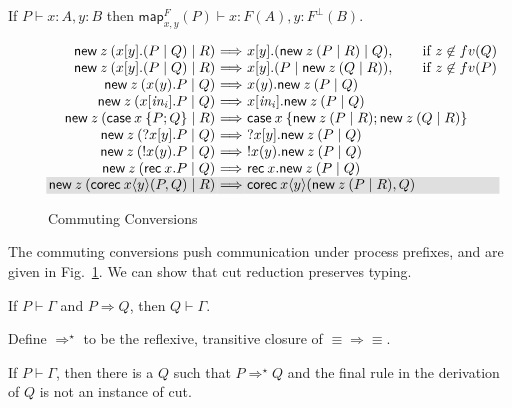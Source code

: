 \documentclass[orivec,envcountsame]{llncs}
\makeatletter
\newcommand{\cpdual}[1]{#1^\perp}
\newcommand{\cptyp}[2]{#1 \vdash #2}
\newcommand{\mapname}{\mathsf{map}}
\newcommand{\map}[3]{\mapname^{#1}_{#2}(#3)}
\newcommand{\mkwd}[1]{\mathsf{#1}}
\newcommand{\cut}[4]{\mkwd{new}\:#1 \: (#3 \mid #4)}
\newcommand{\replicate}[2]{{!#1(#2)}}
\newcommand{\derelict}[2]{{?#1[#2]}}
\newcommand{\rec}[1]{\mkwd{rec}\:#1}
\newcommand{\corec}[4]{\mkwd{corec}\:{#1} \langle #2 \rangle (#3,#4)}
\newcommand{\clabel}[1]{\mathit{#1}}
\renewcommand{\case}[2]{\mkwd{case}\:#1\:\{#2\}}
\newcommand{\sel}[2]{#1[\clabel{#2}]}
\newcommand{\ba}{\begin{array}}
\newcommand{\ea}{\end{array}}
\newenvironment{equations}{\[\ba{@{}r@{~}c@{~}l@{}}}{\ea\]}
\newcommand\shaderow{\noalign{\vskip-0.4pt}\rowcolor{shade}[0.6mm]}
\makeatother
\begin{document}
\begin{lemma}
  If $\cptyp{P}{x:A,y:B}$ then \(\cptyp{\map{F}{x,y}{P}}{x:F(A),y:\cpdual{F}(B)}.\)
\end{lemma}

\begin{figure}[float]
\small
\begin{equations}
  \cut{z}{A}{x[y].(P \mid Q)}{R} &\Longrightarrow& x[y].(\cut{z}{A}{P}{R} \mid Q), \qquad \text{if $z \not\in fv(Q)$} \\
  \cut{z}{A}{x[y].(P \mid Q)}{R} &\Longrightarrow& x[y].(P \mid \cut{z}{A}{Q}{R}), \qquad \text{if $z \not\in fv(P)$} \\
  \cut{z}{A}{x(y).P}{Q} &\Longrightarrow& x(y).\cut{z}{A}{P}{Q} \\
  \cut{z}{A}{\sel{x}{in_i}.P}{Q} &\Longrightarrow& \sel{x}{in_i}.\cut{z}{A}{P}{Q} \\
  \cut{z}{A}{\case{x}{P;Q}}{R} &\Longrightarrow& \case{x}{\cut{z}{A}{P}{R}; \cut{z}{A}{Q}{R}} \\
  \cut{z}{} {\derelict{x}{y}.P}{Q} &\Longrightarrow& \derelict{x}{y}.\cut{z}{}{P}{Q} \\
  \cut{z}{} {\replicate{x}{y}.P}{Q} &\Longrightarrow& \replicate{x}{y}.\cut{z}{}{P}{Q} \\
  \cut{z}{A}{\rec{x}.P}{Q} &\Longrightarrow& \rec{x}.\cut{z}{A}{P}{Q} \\ \shaderow
  \cut{z}{A}{\corec{x}{y}{P}{Q}}{R} &\Longrightarrow& \corec{x}{y}{\cut{z}{A}{P}{R}}{Q} \\
\end{equations}
\caption{Commuting Conversions}\label{fig:commuting}
\end{figure}

The commuting conversions push communication under process prefixes, and are given in
Fig.~\ref{fig:commuting}.  We can show that cut reduction preserves typing.

\begin{theorem}
  If $\cptyp{P}{\Gamma}$ and $P \Longrightarrow Q$, then $\cptyp{Q}{\Gamma}.$
\end{theorem}

Define $\Longrightarrow^\star$ to be the reflexive, transitive closure of $\equiv\Longrightarrow\equiv$.

\begin{theorem}\label{thm:cut-reduction}
  If $\cptyp{P}{\Gamma}$, then there is a $Q$ such that $P \Longrightarrow^\star Q$ and the final
  rule in the derivation of $Q$ is not an instance of cut.
\end{theorem}
\end{document}
